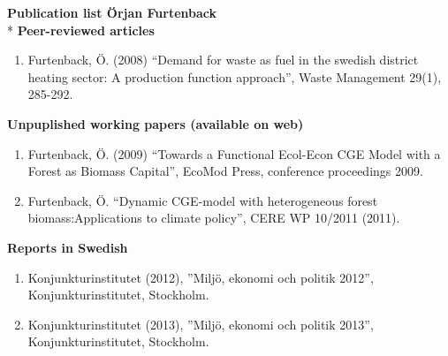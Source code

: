 \textbf{Publication list Örjan Furtenback}\\*
\textbf{Peer-reviewed articles}
\begin{enumerate}
	\item Furtenback, Ö. (2008) “Demand for waste as fuel in the swedish district heating sector: A production function approach”, Waste Management 29(1), 285-292.
\end{enumerate}

\textbf{Unpuplished working papers (available on web)}
\begin{enumerate}
	\item Furtenback, Ö. (2009) “Towards a Functional Ecol-Econ CGE Model with a Forest as Biomass Capital”, EcoMod Press, conference proceedings 2009.
	\item Furtenback, Ö.  “Dynamic CGE-model with heterogeneous forest biomass:Applications to climate policy”, CERE WP 10/2011 (2011).
\end{enumerate}

\textbf{Reports in Swedish}
\begin{enumerate}
	\item Konjunkturinstitutet (2012), ”Miljö, ekonomi och politik 2012”, Konjunkturinstitutet, Stockholm.
	\item Konjunkturinstitutet (2013), ”Miljö, ekonomi och politik 2013”, Konjunkturinstitutet, Stockholm.
\end{enumerate}
